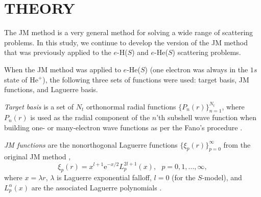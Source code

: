 \documentclass[aip
, pra
, showpacs
, aps
, twocolumn
, groupedaddress
, floatfix
]{revtex4}
\newcommand{\beq}{\begin{equation}}
\newcommand{\eeq}{\end{equation}}
\begin{document}
\begin{table}[htb]
\begin{ruledtabular}
\begin{tabular}{rlll}




\end{tabular}
\end{ruledtabular}
\end{table}



\section{THEORY}

The JM method \cite{JMatrix2008,HY74p1201,BR76p1491} is a very general method for solving a wide range of scattering problems.
In this study, we continue to develop the version of the JM method that
was previously applied to the $e$-H($S$) \cite{KB10p022708}  and $e$-He($S$) \cite{KFB11} scattering problems.


When the JM method was applied to $e$-He($S$) \cite{KFB11} (one electron was always in the $1s$ state of He$^+$),
the following three sets of functions were used: target basis, JM functions, and Laguerre basis.

{\em Target basis} is a set of $N_t$ orthonormal radial functions $\{P_n(r)\}_{n=1}^{N_t}$,
where $P_n(r)$ is used as the radial component of the $n$'th subshell wave function
when building one- or many-electron wave functions as per the Fano's procedure \cite{Fano65, KFB11}.

{\em JM functions} are the nonorthogonal Laguerre functions $\{\xi_p(r)\}_{p=0}^\infty$ from the original JM method \cite{HY74p1201,BR76p1491},
\beq
\xi_p(r) = x^{l+1} \mbox{e}^{-x /2}
L_p^{2l+1}(x), \ \ \ p = 0, 1, ..., \infty,
\eeq
where $x=\lambda r$, $\lambda$ is Laguerre exponential falloff,
$l = 0$ (for the $S$-model), and $L_p^{\alpha}(x)$ are the associated Laguerre polynomials \cite{abramowitz}.
\end{document}
